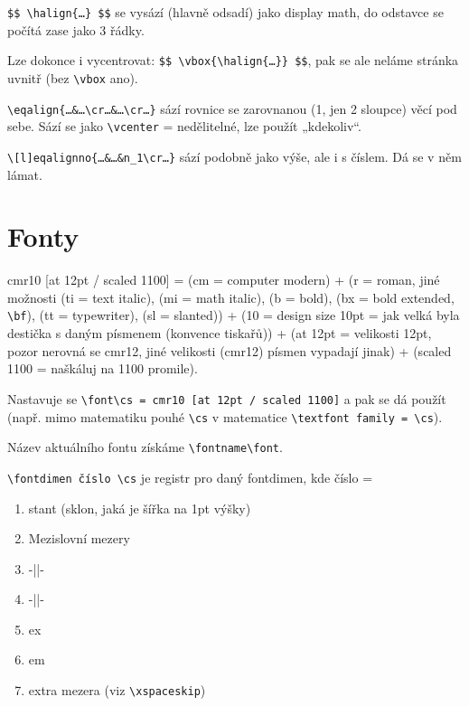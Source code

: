 \documentclass[12pt]{article}					%
\begin{document}
    \begin{definice}
        \verb|$$ \halign{…} $$| se vysází (hlavně odsadí) jako display math, do odstavce se počítá zase jako 3 řádky.

        Lze dokonce i vycentrovat: \verb|$$ \vbox{\halign{…}} $$|, pak se ale neláme stránka uvnitř (bez \verb|\vbox| ano).
    \end{definice}

    \begin{definice}
        \verb|\eqalign{…&…\cr…&…\cr…}| sází rovnice se zarovnanou (1, jen 2 sloupce) věcí pod sebe. Sází se jako \verb|\vcenter| = nedělitelné, lze použít „kdekoliv“.
        
        \verb|\[l]eqalignno{…&…&n_1\cr…}| sází podobně jako výše, ale i s číslem. Dá se v něm lámat.
    \end{definice}

\section{Fonty}
    \begin{definice}
            cmr10 [at 12pt / scaled 1100] = (cm = computer modern) + (r = roman, jiné možnosti (ti = text italic), (mi = math italic), (b = bold), (bx = bold extended, \verb|\bf|), (tt = typewriter), (sl = slanted)) + (10 = design size 10pt = jak velká byla destička s daným písmenem (konvence tiskařů)) + (at 12pt = velikosti 12pt, pozor nerovná se cmr12, jiné velikosti (cmr12) písmen vypadají jinak) + (scaled 1100 = naškáluj na 1100 promile).

            Nastavuje se \verb|\font\cs = cmr10 [at 12pt / scaled 1100]| a pak se dá použít (např. mimo matematiku pouhé \verb|\cs| v matematice \verb|\textfont family = \cs|).

        Název aktuálního fontu získáme \verb|\fontname\font|.
    \end{definice}

    \begin{definice}[fontdimen]
        \verb|\fontdimen číslo \cs| je registr pro daný fontdimen, kde číslo =
        \begin{enumerate}
            \item stant (sklon, jaká je šířka na 1pt výšky)
            \item Mezislovní mezery
            \item -||-
            \item -||-
            \item ex
            \item em
            \item extra mezera (viz \verb|\xspaceskip|)
        \end{enumerate}
    \end{definice}
\end{document}
